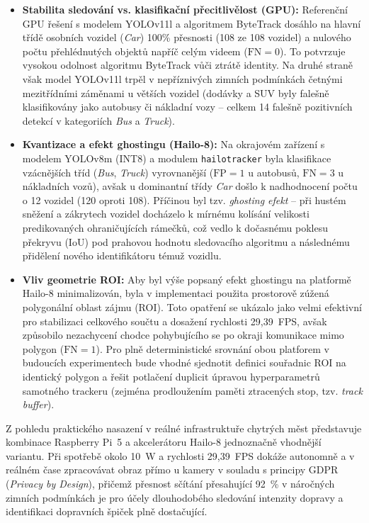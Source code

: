 \documentclass[male,czech,api_bc]{kitheses}
\begin{document}
\begin{itemize}
    \item \textbf{Stabilita sledování vs. klasifikační přecitlivělost (GPU):} Referenční GPU řešení s modelem YOLOv11l a algoritmem ByteTrack dosáhlo na hlavní třídě osobních vozidel (\textit{Car}) 100\% přesnosti (108 ze 108 vozidel) a nulového počtu přehlédnutých objektů napříč celým videem ($\text{FN} = 0$). To potvrzuje vysokou odolnost algoritmu ByteTrack vůči ztrátě identity. Na druhé straně však model YOLOv11l trpěl v nepříznivých zimních podmínkách četnými mezitřídními záměnami u větších vozidel (dodávky a SUV byly falešně klasifikovány jako autobusy či nákladní vozy – celkem 14 falešně pozitivních detekcí v kategoriích \textit{Bus} a \textit{Truck}).
    \item \textbf{Kvantizace a efekt ghostingu (Hailo-8):} Na okrajovém zařízení s modelem YOLOv8m (INT8) a modulem \texttt{hailotracker} byla klasifikace vzácnějších tříd (\textit{Bus}, \textit{Truck}) vyrovnanější ($\text{FP}=1$ u autobusů, $\text{FN}=3$ u nákladních vozů), avšak u dominantní třídy \textit{Car} došlo k nadhodnocení počtu o 12 vozidel (120 oproti 108). Příčinou byl tzv. \textit{ghosting efekt} – při hustém sněžení a zákrytech vozidel docházelo k mírnému kolísání velikosti predikovaných ohraničujících rámečků, což vedlo k dočasnému poklesu překryvu (\acs{IoU}) pod prahovou hodnotu sledovacího algoritmu a následnému přidělení nového identifikátoru témuž vozidlu.
    \item \textbf{Vliv geometrie ROI:} Aby byl výše popsaný efekt ghostingu na platformě Hailo-8 minimalizován, byla v implementaci použita prostorově zúžená polygonální oblast zájmu (ROI). Toto opatření se ukázalo jako velmi efektivní pro stabilizaci celkového součtu a dosažení rychlosti 29,39~FPS, avšak způsobilo nezachycení chodce pohybujícího se po okraji komunikace mimo polygon ($\text{FN}=1$). Pro plně deterministické srovnání obou platforem v budoucích experimentech bude vhodné sjednotit definici souřadnic ROI na identický polygon a řešit potlačení duplicit úpravou hyperparametrů samotného trackeru (zejména prodloužením paměti ztracených stop, tzv. \textit{track buffer}).
\end{itemize}

Z pohledu praktického nasazení v reálné infrastruktuře chytrých měst představuje kombinace Raspberry Pi~5 a akcelerátoru Hailo-8 jednoznačně vhodnější variantu. Při spotřebě okolo 10~W a rychlosti 29,39~FPS dokáže autonomně a v reálném čase zpracovávat obraz přímo u kamery v souladu s principy GDPR (\textit{Privacy by Design}), přičemž přesnost sčítání přesahující 92~\% v náročných zimních podmínkách je pro účely dlouhodobého sledování intenzity dopravy a identifikaci dopravních špiček plně dostačující.
\end{document}
